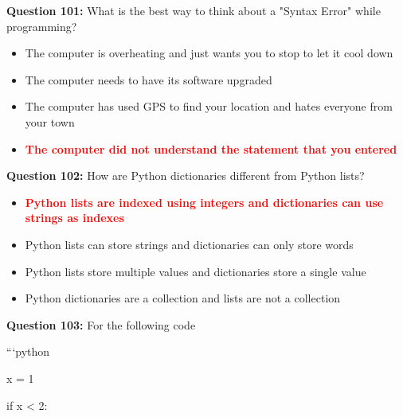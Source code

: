 \documentclass[12pt,a4paper]{article}
\begin{document}
\vspace{0.5cm}

\textbf{Question 101:} What is the best way to think about a "Syntax Error" while programming?

\begin{itemize}
    \item[\textbf{A.}] The computer is overheating and just wants you to stop to let it cool down
    \item[\textbf{B.}] The computer needs to have its software upgraded
    \item[\textbf{C.}] The computer has used GPS to find your location and hates everyone from your town
    \item[\textbf{D.}] \textcolor{red}{\textbf{The computer did not understand the statement that you entered}}
\end{itemize}

\vspace{0.5cm}

\textbf{Question 102:} How are Python dictionaries different from Python lists?

\begin{itemize}
    \item[\textbf{A.}] \textcolor{red}{\textbf{Python lists are indexed using integers and dictionaries can use strings as indexes}}
    \item[\textbf{B.}] Python lists can store strings and dictionaries can only store words
    \item[\textbf{C.}] Python lists store multiple values and dictionaries store a single value
    \item[\textbf{D.}] Python dictionaries are a collection and lists are not a collection
\end{itemize}

\vspace{0.5cm}

\textbf{Question 103:} For the following code\newline

\newline
\newline

\newline
```python\newline

\newline
x = 1\newline

\newline
if x < 2:\newline
\end{document}

